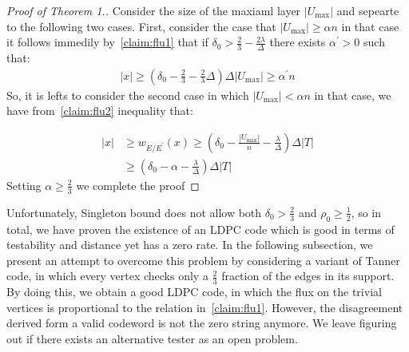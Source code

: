   \begin{proof}[Proof of Theorem 1.] Consider the size of the maxiaml layer $|U_{\max}|$ and sepearte to the following two cases. First, consider the case that $|U_{\max}| \ge  \alpha n $ in that case it follows immedily by~\cref{claim:flu1} that if $\delta_{0} > \frac{2}{3} - \frac{2\lambda}{\Delta}$ there exists $\alpha^{\prime} > 0 $ such that:  
  \begin{equation*}
    \begin{split}
      |x| \ge \left( \delta_{0} - \frac{2}{3} - \frac{2}{\lambda}\Delta \right)\Delta|U_{\max}| \ge  \alpha^{\prime} n 
    \end{split}
  \end{equation*}
  So, it is lefts to consider the second case in which $ |U_{\max}| < \alpha n $ in that case, we have from~\cref{claim:flu2} inequality that: 

  \begin{equation*}
    \begin{split}
      |x| & \ge  w_{E/E^{\prime}}\left( x \right)  \ge \left( \delta_{0} - \frac{|U_{\max}|}{n} - \frac{\lambda}{\Delta} \right) \Delta|T| \\ 
      & \ge \left( \delta_{0} - \alpha - \frac{\lambda}{\Delta} \right) \Delta|T| 
    \end{split}
  \end{equation*}
  Setting $\alpha \ge \frac{2}{3}$ we complete the proof
\end{proof}

Unfortunately, Singleton bound does not allow both $\delta_0 > \frac{2}{3}$ and $\rho_0 \ge \frac{1}{2}$, so in total, we have proven the existence of an LDPC code which is good in terms of testability and distance yet has a zero rate. In the following subsection, we present an attempt to overcome this problem by considering a variant of Tanner code, in which every vertex checks only a $\frac{2}{3}$ fraction of the edges in its support. By doing this, we obtain a good LDPC code, in which the flux on the trivial vertices is proportional to the relation in~\cref{claim:flu1}. However, the disagreement derived form a valid codeword is not the zero string anymore. We leave figuring out if there exists an alternative tester as an open problem.

